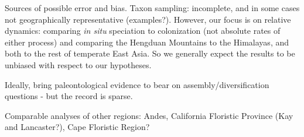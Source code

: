 Sources of possible error and bias. Taxon sampling: incomplete, and in some cases not geographically representative (examples?). However, our focus is on relative dynamics: comparing \textit{in situ} speciation to colonization (not absolute rates of either process) and comparing the Hengduan Mountains to the Himalayas, and both to the rest of temperate East Asia. So we generally expect the results to be unbiased with respect to our hypotheses.

Ideally, bring paleontological evidence to bear on assembly/diversification questions - but the record is sparse.

Comparable analyses of other regions: Andes, California Floristic Province (Kay and Lancaster?), Cape Floristic Region?
